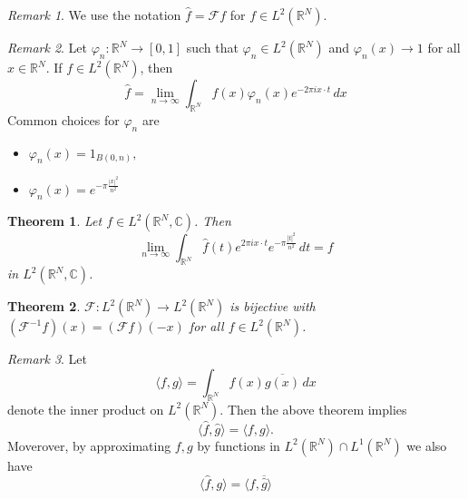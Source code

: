 \documentclass[10pt, oneside, reqno]{amsart}
\theoremstyle{plain}%
\newtheorem{thm}{Theorem}[section]
\theoremstyle{definition}
\theoremstyle{remark}
\newtheorem*{rem}{Remark}
\newcommand{\R}{\mathbb{R}}
\newcommand{\Com}{\mathbb{C}}
\renewcommand{\phi}{\varphi}
\begin{document}
\begin{rem}
	We use the notation $\hat f = \mathcal{F} f$ for $f \in L^2(\R^N)$.  
\end{rem}
\begin{rem}
	Let $\phi_n : \R^N \rightarrow [0,1]$ such that $\phi_n \in L^2(\R^N)$ and $\phi_n(x) \rightarrow 1$ for all $x \in \R^N$. If $f \in L^2(\R^N)$, then \[
		\hat f = \lim_{n \rightarrow \infty} \int_{\R^N} f(x) \phi_n(x) e^{-2 \pi i x \cdot t} \, dx
	\]
	Common choices for $\phi_n$ are 
	\begin{itemize}
		\item $\phi_n(x) = 1_{B(0,n)},$
		\item $\phi_n(x) = e^{- \pi \frac{|x|^2}{n^2}}$
	\end{itemize}
\end{rem}

\begin{thm}
	Let $f \in L^2(\R^N, \Com)$.  Then \[
		\lim_{n \rightarrow \infty} \int_{\R^N} \hat f (t) e^{2 \pi i x \cdot t} e^{- \pi \frac{|t|^2}{n^2}} \, dt = f
	\] in $L^2(\R^N, \Com)$.
\end{thm}

\begin{thm}
	$\mathcal{F} : L^2(\R^N) \rightarrow L^2(\R^N)$ is bijective with $(\mathcal{F}^{-1} f) (x) = (\mathcal{F} f) (-x)$ for all $f \in L^2(\R^N)
$.
\end{thm}


\begin{rem}
	Let \[
		\langle f, g \rangle = \int_{\R^N} f(x) \overline{g(x)} \, dx
	\] denote the inner product on $L^2(\R^N)$.  Then the above theorem implies \[
		\langle \hat f, \hat g \rangle = \langle f, g \rangle.
	\]
	Moverover, by approximating $f,g$ by functions in $L^2(\R^N) \cap L^1(\R^N)$ we also have \[
		\langle \hat f, g \rangle = \langle f, \overline{\hat g} \rangle
	\]
\end{rem}


















\end{document}
